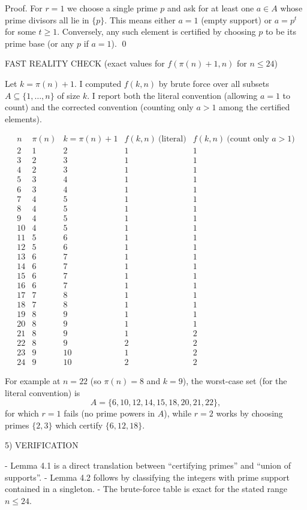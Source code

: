 Proof.
For $r=1$ we choose a single prime $p$ and ask for at least one $a\in A$ whose prime divisors all lie in $\{p\}$.
This means either $a=1$ (empty support) or $a=p^t$ for some $t\ge 1$.
Conversely, any such element is certified by choosing $p$ to be its prime base (or any $p$ if $a=1$). \qed

FAST REALITY CHECK (exact values for $f(\pi(n)+1,n)$ for $n\le 24$)

Let $k=\pi(n)+1$.
I computed $f(k,n)$ by brute force over all subsets $A\subseteq\{1,\dots,n\}$ of size $k$.
I report both the literal convention (allowing $a=1$ to count) and the corrected convention (counting only $a>1$ among the certified elements).

\[
\begin{array}{c|c|c|c|c}
 n & \pi(n) & k=\pi(n)+1 & f(k,n)\ \text{(literal)} & f(k,n)\ \text{(count only }a>1)\\\hline
 2&1&2&1&1\\
 3&2&3&1&1\\
 4&2&3&1&1\\
 5&3&4&1&1\\
 6&3&4&1&1\\
 7&4&5&1&1\\
 8&4&5&1&1\\
 9&4&5&1&1\\
 10&4&5&1&1\\
 11&5&6&1&1\\
 12&5&6&1&1\\
 13&6&7&1&1\\
 14&6&7&1&1\\
 15&6&7&1&1\\
 16&6&7&1&1\\
 17&7&8&1&1\\
 18&7&8&1&1\\
 19&8&9&1&1\\
 20&8&9&1&1\\
 21&8&9&1&2\\
 22&8&9&2&2\\
 23&9&10&1&2\\
 24&9&10&2&2
\end{array}
\]

For example at $n=22$ (so $\pi(n)=8$ and $k=9$), the worst-case set (for the literal convention) is
\[
A=\{6,10,12,14,15,18,20,21,22\},
\]
for which $r=1$ fails (no prime powers in $A$), while $r=2$ works by choosing primes $\{2,3\}$ which certify $\{6,12,18\}$.

5) VERIFICATION

- Lemma 4.1 is a direct translation between ``certifying primes'' and ``union of supports''.
- Lemma 4.2 follows by classifying the integers with prime support contained in a singleton.
- The brute-force table is exact for the stated range $n\le 24$.

